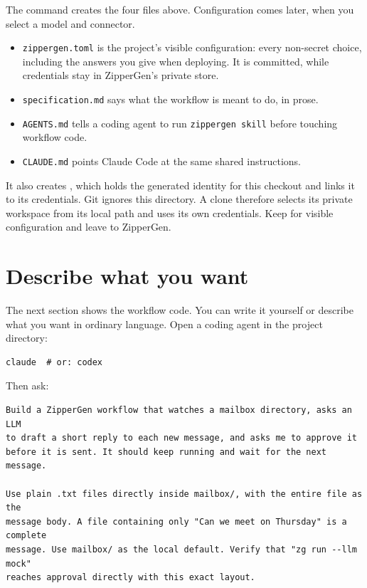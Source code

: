 \documentclass[11pt,a4paper]{article}
\begin{document}
The command creates the four files above. Configuration comes later, when you
select a model and connector.

\begin{itemize}
  \item \texttt{zippergen.toml} is the project's visible configuration: every
        non-secret choice, including the answers you give when deploying. It is
        committed, while credentials stay in ZipperGen's private store.
  \item \texttt{specification.md} says what the workflow is meant to do, in prose.
  \item \texttt{AGENTS.md} tells a coding agent to run
        \texttt{zippergen skill} before touching workflow code.
  \item \texttt{CLAUDE.md} points Claude Code at the same shared instructions.
\end{itemize}

It also creates , which holds the generated identity for this
checkout and links it to its credentials. Git ignores this directory. A clone
therefore selects its private workspace from its local path and uses its own
credentials. Keep  for visible configuration and leave
 to ZipperGen.

\section{Describe what you want}

The next section shows the workflow code. You can write it yourself or describe
what you want in ordinary language. Open a coding agent in the project
directory:

\begin{lstlisting}[style=shell]
claude  # or: codex
\end{lstlisting}

\begin{minipage}{\linewidth}
Then ask:

\begin{lstlisting}[style=agent]
Build a ZipperGen workflow that watches a mailbox directory, asks an LLM
to draft a short reply to each new message, and asks me to approve it
before it is sent. It should keep running and wait for the next message.

Use plain .txt files directly inside mailbox/, with the entire file as the
message body. A file containing only "Can we meet on Thursday" is a complete
message. Use mailbox/ as the local default. Verify that "zg run --llm mock"
reaches approval directly with this exact layout.
\end{lstlisting}
\end{minipage}
\end{document}
